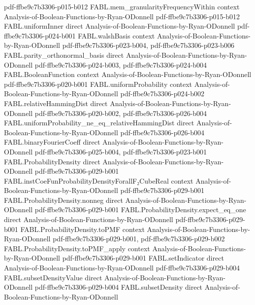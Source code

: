 \begin{theorem}
  {pdf-ffbe9c7b3306-p015-b012}
\proofstep
  {FABL.mem_granularityFrequencyWithin}
  {context}
  {Analysis-of-Boolean-Functions-by-Ryan-ODonnell}
  {pdf-ffbe9c7b3306-p015-b012}
\proofstep
  {FABL.uniformInner}
  {direct}
  {Analysis-of-Boolean-Functions-by-Ryan-ODonnell}
  {pdf-ffbe9c7b3306-p024-b001}
\proofstep
  {FABL.walshBasis}
  {context}
  {Analysis-of-Boolean-Functions-by-Ryan-ODonnell}
  {pdf-ffbe9c7b3306-p023-b004,
    pdf-ffbe9c7b3306-p023-b006}
\proofstep
  {FABL.parity_orthonormal_basis}
  {direct}
  {Analysis-of-Boolean-Functions-by-Ryan-ODonnell}
  {pdf-ffbe9c7b3306-p024-b003,
    pdf-ffbe9c7b3306-p024-b004}
\proofstep
  {FABL.BooleanFunction}
  {context}
  {Analysis-of-Boolean-Functions-by-Ryan-ODonnell}
  {pdf-ffbe9c7b3306-p020-b001}
\proofstep
  {FABL.uniformProbability}
  {context}
  {Analysis-of-Boolean-Functions-by-Ryan-ODonnell}
  {pdf-ffbe9c7b3306-p024-b002}
\proofstep
  {FABL.relativeHammingDist}
  {direct}
  {Analysis-of-Boolean-Functions-by-Ryan-ODonnell}
  {pdf-ffbe9c7b3306-p020-b002,
    pdf-ffbe9c7b3306-p026-b004}
\proofstep
  {FABL.uniformProbability_ne_eq_relativeHammingDist}
  {direct}
  {Analysis-of-Boolean-Functions-by-Ryan-ODonnell}
  {pdf-ffbe9c7b3306-p026-b004}
\proofstep
  {FABL.binaryFourierCoeff}
  {direct}
  {Analysis-of-Boolean-Functions-by-Ryan-ODonnell}
  {pdf-ffbe9c7b3306-p025-b004,
    pdf-ffbe9c7b3306-p023-b001}
\proofstep
  {FABL.ProbabilityDensity}
  {direct}
  {Analysis-of-Boolean-Functions-by-Ryan-ODonnell}
  {pdf-ffbe9c7b3306-p029-b001}
\proofstep
  {FABL.instCoeFunProbabilityDensityForallF₂CubeReal}
  {context}
  {Analysis-of-Boolean-Functions-by-Ryan-ODonnell}
  {pdf-ffbe9c7b3306-p029-b001}
\proofstep
  {FABL.ProbabilityDensity.nonneg}
  {direct}
  {Analysis-of-Boolean-Functions-by-Ryan-ODonnell}
  {pdf-ffbe9c7b3306-p029-b001}
\proofstep
  {FABL.ProbabilityDensity.expect_eq_one}
  {direct}
  {Analysis-of-Boolean-Functions-by-Ryan-ODonnell}
  {pdf-ffbe9c7b3306-p029-b001}
\proofstep
  {FABL.ProbabilityDensity.toPMF}
  {context}
  {Analysis-of-Boolean-Functions-by-Ryan-ODonnell}
  {pdf-ffbe9c7b3306-p029-b001,
    pdf-ffbe9c7b3306-p029-b002}
\proofstep
  {FABL.ProbabilityDensity.toPMF_apply}
  {context}
  {Analysis-of-Boolean-Functions-by-Ryan-ODonnell}
  {pdf-ffbe9c7b3306-p029-b001}
\proofstep
  {FABL.setIndicator}
  {direct}
  {Analysis-of-Boolean-Functions-by-Ryan-ODonnell}
  {pdf-ffbe9c7b3306-p029-b004}
\proofstep
  {FABL.subsetDensityValue}
  {direct}
  {Analysis-of-Boolean-Functions-by-Ryan-ODonnell}
  {pdf-ffbe9c7b3306-p029-b004}
\proofstep
  {FABL.subsetDensity}
  {direct}
  {Analysis-of-Boolean-Functions-by-Ryan-ODonnell}

\end{theorem}
